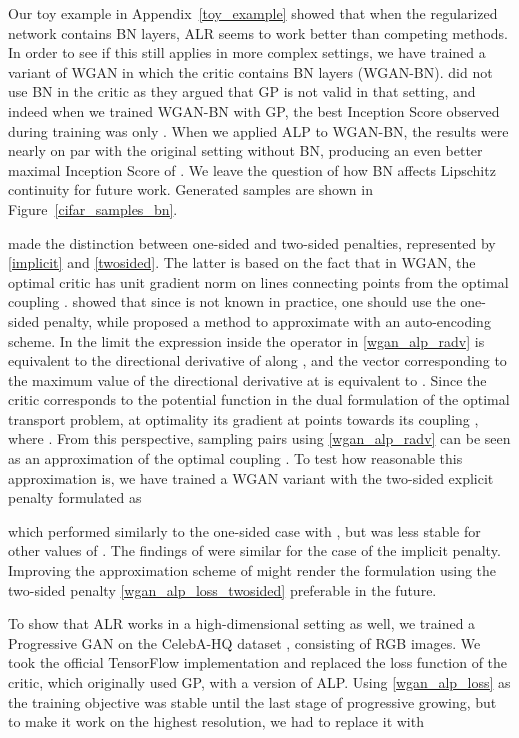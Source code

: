 \documentclass{article}
\begin{document}
Our toy example in Appendix~\ref{toy_example} showed that when the regularized network contains BN layers, ALR seems to work better than competing methods. In order to see if this still applies in more complex settings, we have trained a variant of WGAN in which the critic contains BN layers (WGAN-BN). \citet{Gulrajanietal2017} did not use BN in the critic as they argued that GP is not valid in that setting, and indeed when we trained WGAN-BN with GP, the best Inception Score observed during training was only . When we applied ALP to WGAN-BN, the results were nearly on par with the original setting without BN, producing an even better maximal Inception Score of . We leave the question of how BN affects Lipschitz continuity for future work. Generated samples are shown in Figure~\ref{cifar_samples_bn}.

\citet{Gulrajanietal2017} made the distinction between one-sided and two-sided penalties, represented by \eqref{implicit} and \eqref{twosided}. The latter is based on the fact that in WGAN, the optimal critic has unit gradient norm on lines connecting points from the optimal coupling . \citet{Petzkaetal2018} showed that since  is not known in practice, one should use the one-sided penalty, while \citet{Gemicietal2018} proposed a method to approximate  with an auto-encoding scheme. In the limit  the expression inside  the  operator in \eqref{wgan_alp_radv} is equivalent to the directional derivative of  along , and the vector  corresponding to the maximum value of the directional derivative at  is equivalent to . Since the critic  corresponds to the potential function in the dual formulation of the optimal transport problem, at optimality its gradient at  points towards its coupling , where . From this perspective, sampling pairs  using \eqref{wgan_alp_radv} can be seen as an approximation of the optimal coupling . To test how reasonable this approximation is, we have trained a WGAN variant with the two-sided explicit penalty formulated as

which performed similarly to the one-sided case with , but was less stable for other values of . The findings of \citet{Petzkaetal2018} were similar for the case of the implicit penalty. Improving the approximation scheme of  might render the formulation using the two-sided penalty \eqref{wgan_alp_loss_twosided} preferable in the future.

To show that ALR works in a high-dimensional setting as well, we trained a Progressive GAN on the CelebA-HQ dataset \citep{Karrasetal2017}, consisting of  RGB images. We took the official TensorFlow implementation and replaced the loss function of the critic, which originally used GP, with a version of ALP. Using \eqref{wgan_alp_loss} as the training objective was stable until the last stage of progressive growing, but to make it work on the highest resolution, we had to replace it with
\end{document}
